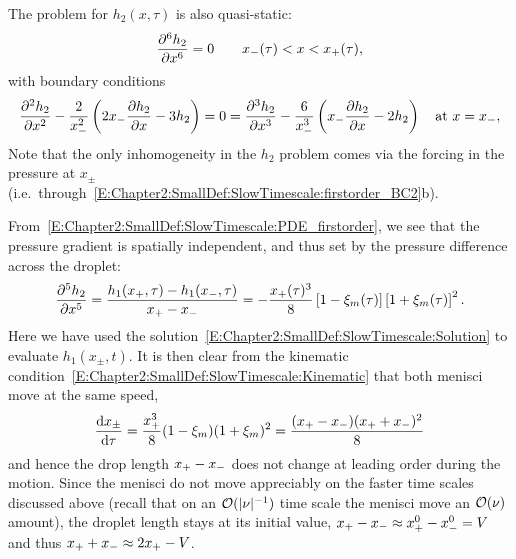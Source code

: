 The problem for $h_2(x, \tau)$ is also quasi-static:
\begin{equation}\label{E:Chapter2:SmallDef:SlowTimescale:PDE_firstorder}
\frac{\partial ^6h_2}{\partial x^6} = 0 \qquad x_{-}(\tau) < x <x_{+}(\tau),
\end{equation}
with boundary conditions
\begin{equation}\label{E:Chapter2:SmallDef:SlowTimescale:firstorder_BC1}
\frac{\partial ^2 h_2}{\partial x^2} - \frac{2}{x_{-}^2}\left(2x_{-} \frac{\partial h_2}{\partial x} - 3h_2\right)= 0 = \frac{\partial ^3 h_2}{\partial x^3} - \frac{6}{x_{-}^3}\left(x_{-} \frac{\partial h_2}{\partial x} - 2h_2\right) \quad \text{at}~x = x_{-},
\end{equation}
Note that the only inhomogeneity in the $h_2$ problem comes via the forcing in the pressure at $x_{\pm}$ (i.e.~through~\eqref{E:Chapter2:SmallDef:SlowTimescale:firstorder_BC2}b).

From~\eqref{E:Chapter2:SmallDef:SlowTimescale:PDE_firstorder}, we see that the pressure gradient is spatially independent, and thus set by the pressure difference across the droplet:
\begin{equation}
\frac{\partial ^5 h_2}{\partial x^5} = \frac{h_1(x_{+},\tau) - h_1(x_{-}, \tau)}{x_{+} - x_{-}} =-\frac{x_{+}(\tau)^3}{8}\left[1-\xi_m(\tau)\right]\left[1+\xi_m(\tau)\right]^2.
\end{equation}
Here we have used the solution~\eqref{E:Chapter2:SmallDef:SlowTimescale:Solution} to evaluate $h_1(x_\pm,t)$. It is then clear from the kinematic condition~\eqref{E:Chapter2:SmallDef:SlowTimescale:Kinematic} that both menisci move at the same speed,
\begin{equation}\label{E:Chapter2:SmallDef:SlowTimescale:ODE}
\frac{\mathrm{d} x_{\pm}}{\mathrm{d} \tau}  = \frac{x_{+}^3}{8}(1-\xi_m)(1+\xi_m)^2 = \frac{(x_{+} - x_{-})(x_{+} + x_{-})^2}{8}
\end{equation}
and hence the drop length $x_{+} - x_{-}$ does not change at leading order during the motion. Since the menisci do not move appreciably on the faster time scales discussed above (recall that on an $\mathcal{O}(|\nu|^{-1})$ time scale the menisci move an $\mathcal{O}(\nu)$ amount), the droplet length stays at its initial value, $x_{+} - x_{-}\approx  x_{+}^0 - x_{-}^0 = V$ and thus $x_{+} + x_{-} \approx 2x_{+} - V$.

